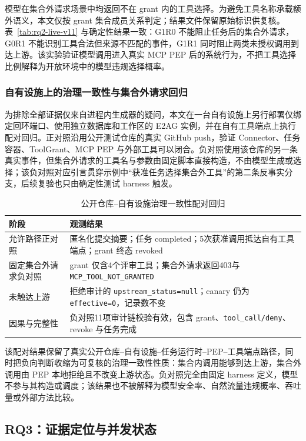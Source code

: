 模型在集合外请求场景中均返回不在 grant 内的工具选择。为避免工具名称承载额外语义，本文仅按 grant 集合成员关系判定；结果文件保留原始标识供复核。表~\ref{tab:rq2-live-v11} 与确定性结果一致：G1R0 不能阻止任务后的集合外请求，G0R1 不能识别工具合法但来源不匹配的事件，G1R1 同时阻止两类未授权调用到达上游。该实验验证模型调用进入真实 MCP PEP 后的系统行为，不把工具选择比例解释为开放环境中的模型违规选择概率。

\subsubsection{自有设施上的治理一致性与集合外请求回归}

为排除全部证据仅来自进程内生成器的疑问，本文在一台自有设施上另行部署仅绑定回环端口、使用独立数据库和工作区的 E2AG 实例，并在自有工具端点上执行配对回归。正对照沿用公开测试仓库的真实 GitHub push，验证 Connector、任务容器、ToolGrant、MCP PEP 与外部工具可以闭合。负对照使用该仓库的另一条真实事件，但集合外请求的工具名与参数由固定脚本直接构造，不由模型生成或选择；该负对照对应引言贯穿示例中“获准任务选择集合外工具”的第二条反事实分支，后续复验也只由确定性测试 harness 触发。

\begin{table}[htbp]
\centering
\caption{公开仓库--自有设施治理一致性配对回归}
\label{tab:rq2-field-v11}
\small
\begin{tabular}{p{35mm}p{95mm}}
\toprule
阶段 & 观测结果 \\
\midrule
允许路径正对照 & 匿名化提交摘要；任务 completed；5次获准调用抵达自有工具端点；grant 终态 revoked \\
固定集合外请求负对照 & grant 仅含4个评审工具；集合外请求返回403与 \texttt{MCP\_TOOL\_NOT\_GRANTED} \\
未触达上游 & 拒绝审计的 \texttt{upstream\_status=null}；canary 仍为 \texttt{effective=0}，记录数不变 \\
因果与完整性 & 负对照11项审计链校验有效，包含 grant、\texttt{tool\_call/deny}、revoke 与任务完成 \\
\bottomrule
\end{tabular}
\end{table}

该配对结果保留了真实公开仓库--自有设施--任务运行时--PEP--工具端点路径，同时把负向判断收缩为可复核的治理一致性性质：集合内调用能够到达上游，集合外调用由 PEP 本地拒绝且不改变上游状态。负对照完全由固定 harness 定义，模型不参与其构造或调度；该结果也不被解释为模型安全率、自然流量违规概率、吞吐量或外部方法比较。

\subsection{RQ3：证据定位与并发状态}

